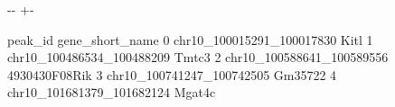 \documentclass[letterpaper,10pt,english]{sphinxmanual}
\newlength\nbsphinxcodecellspacing
\begin{document}
{

\kern-\sphinxverbatimsmallskipamount\kern-\baselineskip
\kern+\FrameHeightAdjust\kern-\fboxrule
\vspace{\nbsphinxcodecellspacing}

\begin{sphinxVerbatim}[commandchars=\\\{\}]
\llap{\color{nbsphinxout}[6]:\,\hspace{\fboxrule}\hspace{\fboxsep}}                     peak\_id gene\_short\_name
0  chr10\_100015291\_100017830            Kitl
1  chr10\_100486534\_100488209           Tmtc3
2  chr10\_100588641\_100589556   4930430F08Rik
3  chr10\_100741247\_100742505         Gm35722
4  chr10\_101681379\_101682124          Mgat4c
\end{sphinxVerbatim}
}
\end{document}
